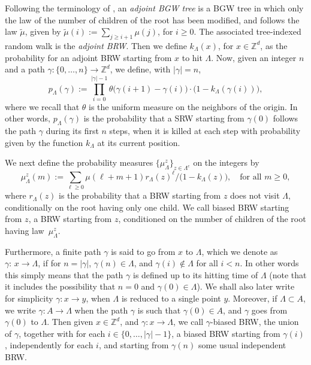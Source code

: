 Following the terminology of \cite{Zhu1,Zhu3}, an
{\it adjoint BGW tree} is a BGW tree in which only the law
of the number of children of
the root has been modified, and follows the law $\tilde \mu$, given by $\tilde \mu(i) := \sum_{j\ge i+1} \mu(j)$, for $i\ge 0$. The associated
tree-indexed random walk is the {\it adjoint BRW}.
Then we define $k_\Lambda(x)$, for $x\in \mathbb Z^d$, as the probability for an adjoint BRW starting from $x$ to hit $\Lambda$.
Now, given an integer $n$ and
a path $\gamma:\{0,\dots,n\} \to \mathbb Z^d$,
we define, with $|\gamma|= n$,
\begin{equation}\label{def.pLambda}
p_\Lambda(\gamma):= \prod_{i=0}^{|\gamma|-1}\theta\big(\gamma(i+1)-\gamma(i)\big) \cdot \big(1- k_\Lambda(\gamma(i))\big),
\end{equation}
where we recall that $\theta$ is the uniform measure on the neighbors of the origin.
In other words, $p_\Lambda(\gamma)$ is the probability that a SRW starting from $\gamma(0)$ follows the path $\gamma$ during its first $n$ steps,
when it is killed at each step with probability given by the function $k_\Lambda$ at its current position.

We next define the probability measures $\{\mu_\Lambda^z\}_{z\in \Lambda^c}$ on the integers by
\begin{equation*}
\mu_\Lambda^z(m) :=
\sum_{\ell \ge 0} \mu(\ell + m +1) r_\Lambda(z)^\ell / \big(1-k_\Lambda(z)\big), \quad \text{for all }m\ge 0,
\end{equation*}
where $r_\Lambda(z)$ is the probability that a BRW starting from $z$ does not visit $\Lambda$, conditionally on the root having only one child.
We call biased BRW starting from $z$, a BRW starting from $z$, conditioned on the number of children of the root having law~$\mu_\Lambda^z$.

Furthermore, a finite path $\gamma$
is said to go from $x$ to $\Lambda$,
which we denote as \hbox{$\gamma{:}\,x\!\to\! \Lambda$},
if for $n=|\gamma|$, $\gamma(n)\in \Lambda$,
and $\gamma(i)\notin \Lambda$ for all $i<n$.
In other words this simply means that the path $\gamma$ is defined up
to its hitting time of $\Lambda$
(note that it includes the possibility that $n=0$ and $\gamma(0) \in \Lambda$). We shall also later
write for simplicity $\gamma:x\to y$, when $\Lambda$ is reduced to a single point $y$. Moreover, if $\Lambda\subset A$, we write $\gamma:A\to \Lambda$ when the path $\gamma$ is such that $\gamma(0)\in A$, and $\gamma$ goes from $\gamma(0)$ to $\Lambda$.
Then given $x\in \mathbb Z^d$, and $\gamma:x\to \Lambda$,
we call $\gamma$-biased BRW, the union of $\gamma$, together with for each $i\in \{0,\dots,|\gamma|-1\}$,
a biased BRW starting from $\gamma(i)$, independently for each $i$, and starting from $\gamma(n)$ some usual independent BRW.

